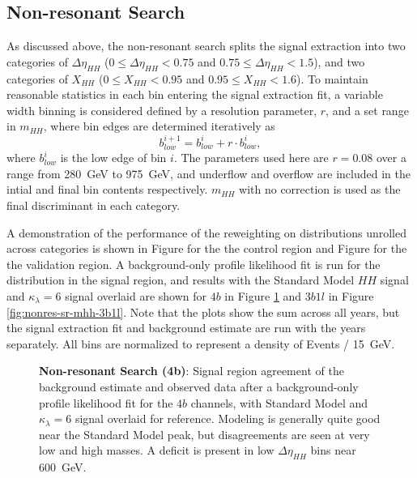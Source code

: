 \FloatBarrier
\subsection{Non-resonant Search}
As discussed above, the non-resonant search splits the signal extraction into two categories of 
$\Delta\eta_{HH}$ ($0 \leq \Delta\eta_{HH} < 0.75$ and $0.75 \leq \Delta\eta_{HH} < 1.5$), 
and two categories of $X_{HH}$ ($0 \leq X_{HH} < 0.95$ and $0.95 \leq X_{HH} < 1.6$). 
To maintain reasonable statistics in each bin entering the signal extraction fit, a 
variable width binning is considered defined by a resolution parameter, $r$, and a set range in 
$m_{HH}$, where bin edges are determined iteratively as
\begin{equation}
b_{low}^{i+1} = b_{low}^{i} + r\cdot b_{low}^{i},
\end{equation}
where $b_{low}^{i}$ is the low edge of bin $i$. The parameters used here are 
$r=0.08$ over a range from \SI{280}{\GeV} to \SI{975}{\GeV}, and underflow and 
overflow are included in the intial and final bin contents respectively. $m_{HH}$ with 
no correction is used as the final discriminant in each category.

A demonstration of the performance of the reweighting on distributions unrolled across categories is shown 
in Figure  for the the control region and Figure  for 
the the validation region. A background-only profile likelihood fit is run for the distribution in the signal 
region, and results with the Standard Model $HH$ signal and $\kappa_{\lambda}=6$ signal overlaid are shown for $4b$ in Figure \ref{fig:nonres-sr-mhh-4b} and $3b1l$ in Figure \ref{fig:nonres-sr-mhh-3b1l}. Note that 
the plots show the sum across all years, but the signal extraction fit and background estimate are run with the 
years separately. All bins are normalized to represent a density of Events / \SI{15}{\GeV}.

\begin{figure}[ht]
  \centering
  \hspace*{-2cm}
  \caption{\label{fig:nonres-sr-mhh-4b} \textbf{Non-resonant Search (4b)}: Signal region agreement of the background estimate and observed data after a background-only profile likelihood fit for the $4b$ channels, with Standard Model 
  and $\kappa_{\lambda}=6$ signal overlaid for reference. Modeling is generally quite good near the Standard Model peak, but disagreements are seen at very low and high masses. A deficit is present in low $\Delta\eta_{HH}$ bins near \SI{600}{\GeV}.}
\end{figure}

